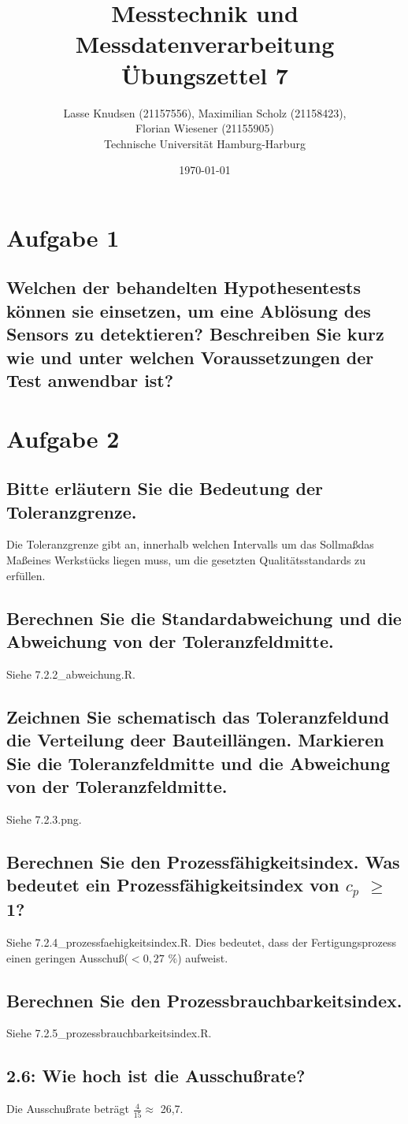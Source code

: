 \documentclass[12pt, a4paper, titlepage]{article}
\title{Messtechnik und Messdatenverarbeitung \\ \"Ubungszettel 7}
\author{Lasse Knudsen (21157556), Maximilian Scholz (21158423), \\
	Florian Wiesener (21155905)  \\
	Technische Universit\"at Hamburg-Harburg \\
}
\date{\today}
\begin{document}
	\maketitle
	 \section{Aufgabe 1}
	 \label{sec:a1}
	 \subsection{Welchen der behandelten Hypothesentests k\"onnen sie einsetzen, um eine Abl\"osung des Sensors zu
	 	detektieren? Beschreiben Sie kurz wie und unter welchen Voraussetzungen der Test anwendbar ist?}
	
	\section{Aufgabe 2}

	\subsection{Bitte erl\"autern Sie die Bedeutung der Toleranzgrenze.}
	Die Toleranzgrenze gibt an, innerhalb welchen Intervalls um das Sollma\ss  das Ma\ss  eines Werkst\"ucks liegen muss,
	um die gesetzten Qualit\"atsstandards zu erf\"ullen.

	\subsection{Berechnen Sie die Standardabweichung und die Abweichung von der Toleranzfeldmitte.}
	Siehe 7.2.2\_abweichung.R.
	
	\subsection{Zeichnen Sie schematisch das Toleranzfeldund die Verteilung deer Bauteill\"angen. Markieren Sie die
		Toleranzfeldmitte und die Abweichung von der Toleranzfeldmitte.}
	Siehe 7.2.3.png.
	
	\subsection{Berechnen Sie den Prozessf\"ahigkeitsindex. Was bedeutet ein Prozessf\"ahigkeitsindex von $c_p$ $\ge$ 1?}
	Siehe 7.2.4\_prozessfaehigkeitsindex.R.
	Dies bedeutet, dass der Fertigungsprozess einen geringen Ausschu\ss  ($<0,27$ $\%$) aufweist.
	
	\subsection{Berechnen Sie den Prozessbrauchbarkeitsindex.}
	Siehe 7.2.5\_prozessbrauchbarkeitsindex.R.

	\subsection{2.6: Wie hoch ist die Ausschu\ss rate?}
	Die Ausschu\ss rate betr\"agt $\frac{4}{15} \approx$ 26,7.
	
\end{document}
